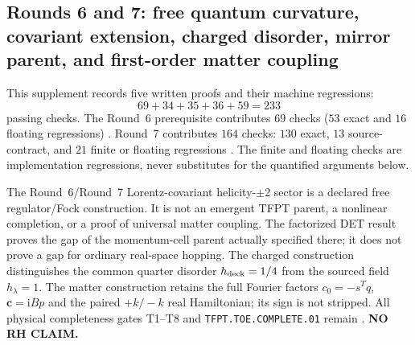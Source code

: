 \subsection*{Rounds 6 and 7: free quantum curvature, covariant extension,
charged disorder, mirror parent, and first-order matter coupling}
\label{sec:toe-round7-proofs}

\begin{keybox}
This supplement records five written proofs and their machine regressions:
\[
 69+34+35+36+59=233
\]
passing checks.  The Round~6 prerequisite contributes \(69\) checks
(\(53\) exact and \(16\) floating regressions)
.
Round~7 contributes \(164\) checks: \(130\) exact, \(13\) source-contract,
and \(21\) finite or floating regressions
.
The finite and floating checks are implementation regressions, never
substitutes for the quantified arguments below.

\smallskip
\noindent The Round~6/Round~7 Lorentz-covariant helicity-\(\pm2\) sector is a
declared free regulator/Fock construction.  It is not an emergent TFPT parent,
a nonlinear completion, or a proof of universal matter coupling.  The
factorized DET result proves the gap of the momentum-cell parent actually
specified there; it does not prove a gap for ordinary real-space hopping.
The charged construction distinguishes the common quarter disorder
\(h_{\rm deck}=1/4\) from the sourced field \(h_\lambda=1\).  The matter
construction retains the full Fourier factors
\(c_0=-s^Tq\), \(\boldsymbol c=\mathrm{i}Bp\) and the paired
\(+k/-k\) real Hamiltonian; its sign is not stripped.  All physical
completeness gates T1--T8 and \texttt{TFPT.TOE.COMPLETE.01} remain \mO.
\textbf{NO RH CLAIM.}
\end{keybox}






